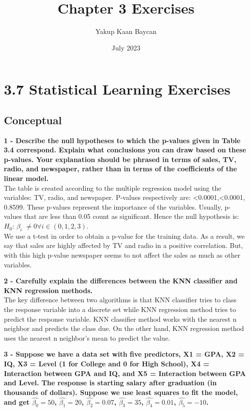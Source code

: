 \documentclass{article}
\title{Chapter 3 Exercises}
\author{Yakup Kaan Baycan}
\date{July 2023}
\begin{document}
\maketitle

\section{3.7 Statistical Learning Exercises}
\subsection{Conceptual}

\textbf{1 - Describe the null hypotheses to which the p-values given in Table 3.4
correspond. Explain what conclusions you can draw based on these
p-values. Your explanation should be phrased in terms of sales, TV,
radio, and newspaper, rather than in terms of the coefficients of the
linear model.} \\ 

The table is created according to the multiple regression model using the variables: TV, radio, and newspaper. P-values respectively are: <0.0001,<0.0001, 0.8599. These p-values represent the importance of the variables. Usually, p-values that are less than 0.05 count as significant. Hence the null hypothesis is:\\
$H_0$: $\beta_i$ $\neq0  \forall i \in (0,1,2,3).$\\
We use a t-test in order to obtain a p-value for the training data. As a result, we say that sales are highly affected by TV and radio in a positive correlation. But, with this high p-value newspaper seems to not affect the sales as much as other variables.

\textbf{2 - Carefully explain the differences between the KNN classifier and KNN
regression methods.}\\

The key difference between two algorithms is that KNN classifier tries to class the response variable into a discrete set while KNN regression method tries to predict the response variable. KNN classifier method works with the nearest n neighbor and predicts the class due. On the other hand, KNN regression method uses the nearest n neighbor's mean to predict the value. 

\textbf{3 - Suppose we have a data set with five predictors, X1 = GPA, X2 =
IQ, X3 = Level (1 for College and 0 for High School), X4 = Interaction
between GPA and IQ, and X5 = Interaction between GPA and
Level. The response is starting salary after graduation (in thousands
of dollars). Suppose we use least squares to fit the model, and get
$\hat{\beta_0} = 50$, $\hat{\beta_1} = 20$, $\hat{\beta_2} = 0.07$, $\hat{\beta_3} = 35$, $\hat{\beta_4} = 0.01$, $\hat{\beta_5} = −10$.} \\
\end{document}
